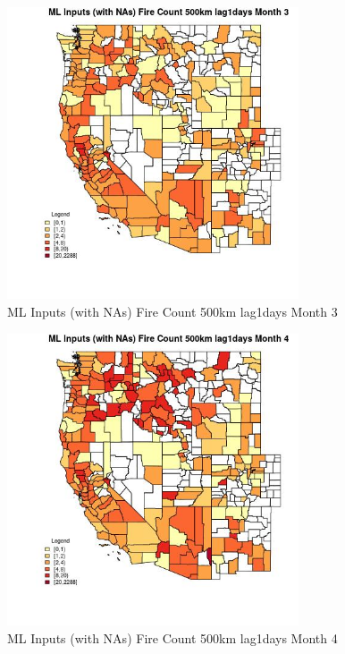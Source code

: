 \begin{figure} 
\centering  
\includegraphics[width=0.77\textwidth]{Code_Outputs/Report_ML_input_PM25_Step4_part_e_de_duplicated_aves_compiled_2019-05-20wNAs_CountyFire_Count_500km_lag1daysmedianMonth3.jpg} 
\caption{\label{fig:Report_ML_input_PM25_Step4_part_e_de_duplicated_aves_compiled_2019-05-20wNAsCountyFire_Count_500km_lag1daysmedianMonth3}ML Inputs (with NAs) Fire Count 500km lag1days Month 3} 
\end{figure} 
 

\begin{figure} 
\centering  
\includegraphics[width=0.77\textwidth]{Code_Outputs/Report_ML_input_PM25_Step4_part_e_de_duplicated_aves_compiled_2019-05-20wNAs_CountyFire_Count_500km_lag1daysmedianMonth4.jpg} 
\caption{\label{fig:Report_ML_input_PM25_Step4_part_e_de_duplicated_aves_compiled_2019-05-20wNAsCountyFire_Count_500km_lag1daysmedianMonth4}ML Inputs (with NAs) Fire Count 500km lag1days Month 4} 
\end{figure} 
 

